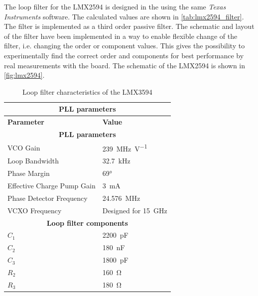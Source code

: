 The loop filter for the LMX2594 is designed in the using the same \textit{Texas Instruments} software. 
The calculated values are shown in \autoref{tab:lmx2594_filter}.
The filter is implemented as a third order passive filter.
The schematic and layout of the filter have been implemented in a way to enable flexible change of the filter, i.e. changing the order or component values.
This gives the possibility to experimentally find the correct order and components for best performance by real measurements with the board.
The schematic of the LMX2594 is shown in \autoref{fig:lmx2594}.
\begin{table}[tbh]
	\caption[LMX2594 loop filter characteristics]{Loop filter characteristics of the LMX3594}
	\label{tab:lmx2594_filter}
	\centering
	\begin{tabularx}{\textwidth}{Xl}
		 \multicolumn{2}{c}{\textbf{PLL parameters}}                             \\
		\toprule
		\textbf{Parameter}                         & \textbf{Value}             \\ 
		\midrule
		\multicolumn{2}{c}{\textbf{PLL parameters}}                             \\
		VCO Gain                                   & \SI{239}{\MHz\per\volt}    \\
		Loop Bandwidth                             & \SI{32.7}{\kHz}            \\
		Phase Margin                               & \ang{69}                   \\
		Effective Charge Pump Gain                 & \SI{3}{\milli\ampere}      \\
		Phase Detector Frequency                   & \SI{24.576}{\MHz}          \\
		VCXO Frequency                             & Designed for \SI{15}{\GHz} \\
		[0.3cm]
		\multicolumn{2}{c}{\textbf{Loop filter components}}   \\                        
		$C_{1}$                          & \SI{2200}{\pico\farad}     \\
		$C_{2}$                          & \SI{180}{\nano\farad}      \\
		$C_{3}$                          & \SI{1800}{\pico\farad}     \\
		$R_{2}$                                    & \SI{160}{\ohm}             \\
		$R_{3}$                          & \SI{180}{\ohm}             \\ \bottomrule
	\end{tabularx}
\end{table}

